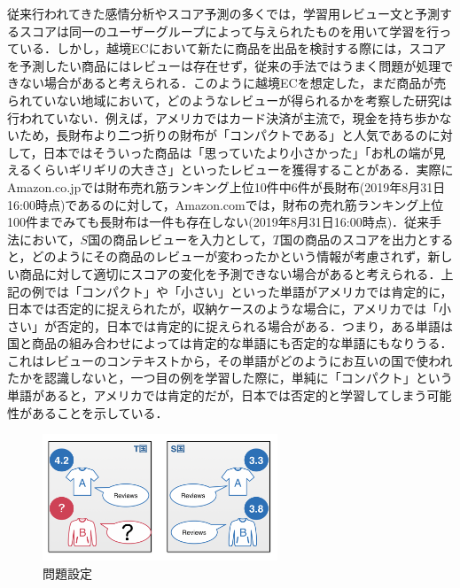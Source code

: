 \documentclass[dvipdfmx,twocolumn,10.5pt]{jsarticle}
\begin{document}
従来行われてきた感情分析やスコア予測の多くでは，学習用レビュー文と予測するスコアは同一のユーザーグループによって与えられたものを用いて学習を行っている．しかし，越境ECにおいて新たに商品を出品を検討する際には，スコアを予測したい商品にはレビューは存在せず，従来の手法ではうまく問題が処理できない場合があると考えられる．このように越境ECを想定した，まだ商品が売られていない地域において，どのようなレビューが得られるかを考察した研究は行われていない．例えば，アメリカではカード決済が主流で，現金を持ち歩かないため，長財布より二つ折りの財布が「コンパクトである」と人気であるのに対して，日本ではそういった商品は「思っていたより小さかった」「お札の端が見えるくらいギリギリの大きさ」といったレビューを獲得することがある．実際にAmazon.co.jpでは財布売れ筋ランキング上位10件中6件が長財布(2019年8月31日16:00時点)であるのに対して，Amazon.comでは，財布の売れ筋ランキング上位100件までみても長財布は一件も存在しない(2019年8月31日16:00時点)．従来手法において，$S$国の商品レビューを入力として，$T$国の商品のスコアを出力とすると，どのようにその商品のレビューが変わったかという情報が考慮されず，新しい商品に対して適切にスコアの変化を予測できない場合があると考えられる．上記の例では「コンパクト」や「小さい」といった単語がアメリカでは肯定的に，日本では否定的に捉えられたが，収納ケースのような場合に，アメリカでは「小さい」が否定的，日本では肯定的に捉えられる場合がある．つまり，ある単語は国と商品の組み合わせによっては肯定的な単語にも否定的な単語にもなりうる．これはレビューのコンテキストから，その単語がどのようにお互いの国で使われたかを認識しないと，一つ目の例を学習した際に，単純に「コンパクト」という単語があると，アメリカでは肯定的だが，日本では否定的と学習してしまう可能性があることを示している．


\begin{figure}[tb]
	\centering
	\includegraphics[width=7cm]{images/problem_setting.png} 
	\caption{問題設定}
	\label{problem_setting}
\end{figure}
\end{document}
